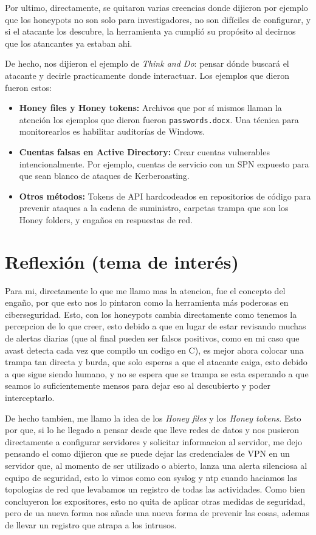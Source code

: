 \documentclass[letterpaper,11pt]{article}
\begin{document}
Por ultimo, directamente, se quitaron varias creencias donde 
dijieron por ejemplo que los honeypots no son 
solo para investigadores, 
no son difíciles de configurar, 
y si el atacante los descubre, 
la herramienta ya cumplió su propósito al decirnos que los atancantes
ya estaban ahi.

De hecho, nos dijieron el ejemplo de \textit{Think and Do}: pensar dónde buscará el atacante y decirle practicamente
donde interactuar. Los ejemplos que dieron fueron estos:

\begin{itemize}
    \item \textbf{Honey files y Honey tokens:} Archivos que por sí mismos llaman la atención los ejemplos que dieron fueron \texttt{passwords.docx}. Una técnica para monitorearlos es habilitar auditorías de Windows.
    \item \textbf{Cuentas falsas en Active Directory:} Crear cuentas vulnerables intencionalmente. Por ejemplo, cuentas de servicio con un SPN expuesto para que sean blanco de ataques de Kerberoasting.
    \item \textbf{Otros métodos:} Tokens de API hardcodeados en repositorios de código para prevenir ataques a la cadena de suministro, carpetas trampa que son los Honey folders, y engaños en respuestas de red.
\end{itemize}


\section{Reflexión (tema de interés)}

Para mi, directamente lo que me llamo mas la atencion, fue el concepto del engaño, 
por que esto nos lo pintaron como la herramienta más poderosas en ciberseguridad. 
Esto, con los honeypots cambia directamente como tenemos la percepcion de lo que creer, esto debido a que
en lugar de estar revisando muchas de alertas diarias (que al final pueden ser falsos positivos,
como en mi caso que avast detecta cada vez que compilo un codigo en C), 
es mejor ahora colocar una trampa tan directa y burda, que solo
esperas a que el atacante caiga, esto debido a que sigue siendo humano, y no se espera que se trampa
se esta esperando a que seamos lo suficientemente mensos para dejar eso al descubierto y poder interceptarlo. 

De hecho tambien, me llamo la idea de los 
\textit{Honey files} y los \textit{Honey tokens}. 
Esto por que, si lo he llegado a pensar
desde que lleve redes de datos y nos pusieron directamente a configurar servidores
y solicitar informacion al servidor, me dejo pensando el como dijieron
que se puede dejar las 
credenciales de VPN en un servidor que, 
al momento de ser utilizado o abierto, 
lanza una alerta silenciosa al equipo de seguridad, 
esto lo vimos como con syslog y ntp cuando haciamos las topologias de red
que levabamos un registro de todas las actividades. 
Como bien concluyeron los expositores, 
esto no quita de aplicar otras medidas de seguridad, 
pero de ua nueva forma nos añade una nueva forma de prevenir 
las cosas, ademas de llevar un registro 
que atrapa a los intrusos.
\end{document}
